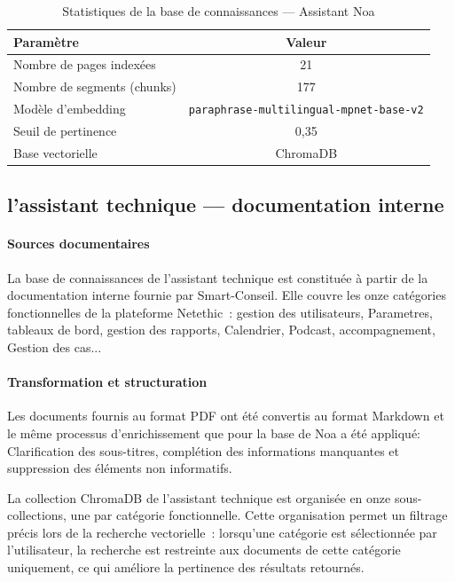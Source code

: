 \vspace{6pt}
\begin{table}[H]
\centering
\caption{Statistiques de la base de connaissances — Assistant Noa}
\label{tab:kb_noa}
\begin{tabular}{|l|c|}
\hline
\textbf{Paramètre} & \textbf{Valeur} \\
\hline
Nombre de pages indexées    & 21 \\
\hline
Nombre de segments (chunks) & 177 \\
\hline
Modèle d'embedding          & \texttt{paraphrase-multilingual-mpnet-base-v2} \\
\hline
Seuil de pertinence         & 0,35 \\
\hline
Base vectorielle            & ChromaDB \\
\hline
\end{tabular}
\end{table}

\subsection{l'assistant technique — documentation interne}

\paragraph{Sources documentaires}\mbox{}\newline

La base de connaissances de l'assistant technique est constituée à partir
de la documentation interne fournie par Smart-Conseil.
Elle couvre les onze catégories fonctionnelles de la plateforme Netethic~:
gestion des utilisateurs, Parametres, tableaux de bord, gestion des rapports, Calendrier,
Podcast, accompagnement, Gestion des cas...

\paragraph{Transformation et structuration}\mbox{}\newline

Les documents fournis au format PDF ont été convertis au format Markdown
et le même processus d'enrichissement que pour la base de Noa a été appliqué:
Clarification des sous-titres, complétion des informations manquantes
et suppression des éléments non informatifs.

La collection ChromaDB de l'assistant technique est organisée en onze sous-collections,
une par catégorie fonctionnelle.
Cette organisation permet un filtrage précis lors de la recherche vectorielle~:
lorsqu'une catégorie est sélectionnée par l'utilisateur, la recherche
est restreinte aux documents de cette catégorie uniquement,
ce qui améliore la pertinence des résultats retournés.

